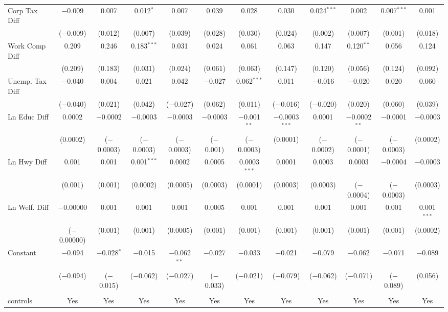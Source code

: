 \begin{table}[!htbp]
\begin{tabular}{@{\extracolsep{5pt}}lccccccccccc}
  Corp Tax Diff & $-$0.009 & 0.007 & 0.012$^{*}$ & 0.007 & 0.039 & 0.028 & 0.030 & 0.024$^{***}$ & 0.002 & 0.007$^{***}$ & 0.001 \\ 
  & ($-$0.009) & (0.012) & (0.007) & (0.039) & (0.028) & (0.030) & (0.024) & (0.002) & (0.007) & (0.001) & (0.018) \\ 
  Work Comp Diff & 0.209 & 0.246 & 0.183$^{***}$ & 0.031 & 0.024 & 0.061 & 0.063 & 0.147 & 0.120$^{**}$ & 0.056 & 0.124 \\ 
  & (0.209) & (0.183) & (0.031) & (0.024) & (0.061) & (0.063) & (0.147) & (0.120) & (0.056) & (0.124) & (0.092) \\ 
  Unemp. Tax Diff & $-$0.040 & 0.004 & 0.021 & 0.042 & $-$0.027 & 0.062$^{***}$ & 0.011 & $-$0.016 & $-$0.020 & 0.020 & 0.060 \\ 
  & ($-$0.040) & (0.021) & (0.042) & ($-$0.027) & (0.062) & (0.011) & ($-$0.016) & ($-$0.020) & (0.020) & (0.060) & (0.039) \\ 
  Ln Educ Diff & 0.0002 & $-$0.0002 & $-$0.0003 & $-$0.0003 & $-$0.0003 & $-$0.001$^{**}$ & $-$0.0003$^{***}$ & 0.0001 & $-$0.0002$^{**}$ & $-$0.0001 & $-$0.0003 \\ 
  & (0.0002) & ($-$0.0003) & ($-$0.0003) & ($-$0.0003) & ($-$0.001) & ($-$0.0003) & (0.0001) & ($-$0.0002) & ($-$0.0001) & ($-$0.0003) & (0.0002) \\ 
  Ln Hwy Diff & 0.001 & 0.001 & 0.001$^{***}$ & 0.0002 & 0.0005 & 0.0003$^{***}$ & 0.0001 & 0.0003 & 0.0003 & $-$0.0004 & $-$0.0003 \\ 
  & (0.001) & (0.001) & (0.0002) & (0.0005) & (0.0003) & (0.0001) & (0.0003) & (0.0003) & ($-$0.0004) & ($-$0.0003) & (0.0003) \\ 
  Ln Welf. Diff & $-$0.00000 & 0.001 & 0.001 & 0.001 & 0.0005 & 0.001 & 0.001 & 0.001 & 0.001 & 0.001 & 0.001$^{***}$ \\ 
  & ($-$0.00000) & (0.001) & (0.001) & (0.0005) & (0.001) & (0.001) & (0.001) & (0.001) & (0.001) & (0.001) & (0.0002) \\ 
  Constant & $-$0.094 & $-$0.028$^{*}$ & $-$0.015 & $-$0.062$^{**}$ & $-$0.027 & $-$0.033 & $-$0.021 & $-$0.079 & $-$0.062 & $-$0.071 & $-$0.089 \\ 
  & ($-$0.094) & ($-$0.015) & ($-$0.062) & ($-$0.027) & ($-$0.033) & ($-$0.021) & ($-$0.079) & ($-$0.062) & ($-$0.071) & ($-$0.089) & (0.056) \\ 
 \hline \\[-1.8ex] 
controls & Yes & Yes & Yes & Yes & Yes & Yes & Yes & Yes & Yes & Yes & Yes \\ 

\end{tabular}
\end{table}
